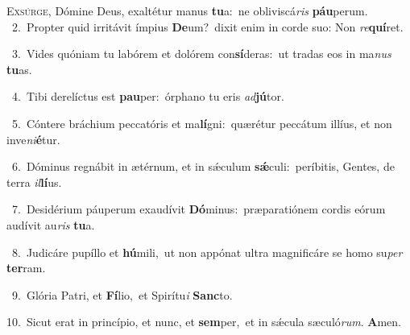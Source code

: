 \lettrine{\initial\textcolor{\initialcolor}{E}}{xsúrge,} Dómine Deus, exaltétur manus \textbf{tu}\-a:~\star ne obliviscá\textit{ris} \textbf{páu}\-perum.\\
{\numbfont\textcolor{\numbcolor}{~2.}}~Propter quid irritávit ímpius \textbf{De}\-um?~\star dixit enim in corde suo: Non \textit{re}\-\textbf{quí}ret.\par
{\numbfont\textcolor{\numbcolor}{~3.}}~Vides quóniam tu labórem et dolórem con\-\textbf{sí}\-deras:~\star ut tradas eos in ma\textit{nus} \textbf{tu}\-as.\par
{\numbfont\textcolor{\numbcolor}{~4.}}~Tibi derelíctus est \textbf{pau}\-per:~\star órphano tu eris \textit{ad}\-\textbf{jú}tor.\par
{\numbfont\textcolor{\numbcolor}{~5.}}~Cóntere bráchium peccatóris et ma\-\textbf{lí}\-gni:~\star quærétur peccátum illíus, et non inve\-\textit{ni}\-\textbf{é}tur.\par
{\numbfont\textcolor{\numbcolor}{~6.}}~Dóminus regnábit in ætérnum, et in sǽculum \textbf{sǽ}\-culi:~\star períbitis, Gentes, de terra \textit{il}\-\textbf{lí}us.\par
{\numbfont\textcolor{\numbcolor}{~7.}}~Desidérium páuperum exaudívit \textbf{Dó}\-minus:~\star præparatiónem cordis eórum audívit au\textit{ris} \textbf{tu}\-a.\par
{\numbfont\textcolor{\numbcolor}{~8.}}~Judicáre pupíllo et \textbf{hú}\-mili,~\star ut non appónat ultra magnificáre se homo su\textit{per} \textbf{ter}\-ram.\par
{\numbfont\textcolor{\numbcolor}{~9.}}~Glória Patri, et \textbf{Fí}\-lio,~\star et Spirítu\textit{i} \textbf{Sanc}\-to.\par
{\numbfont\textcolor{\numbcolor}{10.}}~Sicut erat in princípio, et nunc, et \textbf{sem}\-per,~\star et in sǽcula sæculó\-\textit{rum}\-. \textbf{A}\-men.\par
